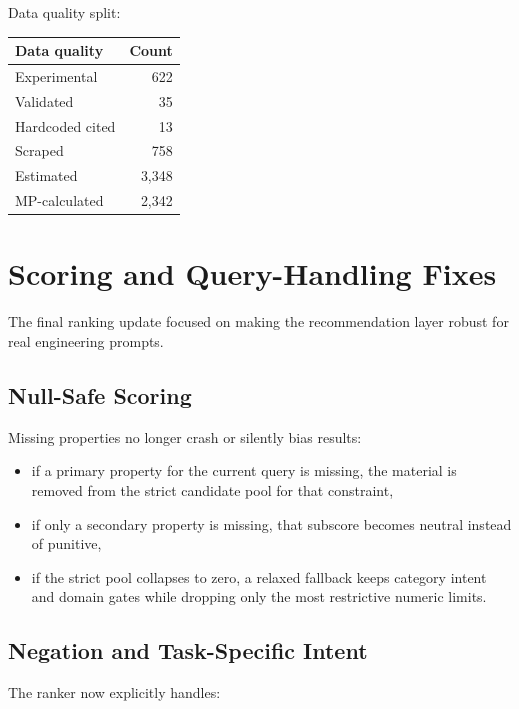 \documentclass[11pt,a4paper]{article}
\begin{document}
Data quality split:

\begin{center}
\begin{tabular}{lr}
\toprule
\textbf{Data quality} & \textbf{Count} \\
\midrule
Experimental & 622 \\
Validated & 35 \\
Hardcoded cited & 13 \\
Scraped & 758 \\
Estimated & 3,348 \\
MP-calculated & 2,342 \\
\bottomrule
\end{tabular}
\end{center}

\section{Scoring and Query-Handling Fixes}

The final ranking update focused on making the recommendation layer robust for real engineering prompts.

\subsection{Null-Safe Scoring}

Missing properties no longer crash or silently bias results:

\begin{itemize}[leftmargin=*]
  \item if a primary property for the current query is missing, the material is removed from the strict candidate pool for that constraint,
  \item if only a secondary property is missing, that subscore becomes neutral instead of punitive,
  \item if the strict pool collapses to zero, a relaxed fallback keeps category intent and domain gates while dropping only the most restrictive numeric limits.
\end{itemize}

\subsection{Negation and Task-Specific Intent}

The ranker now explicitly handles:
\end{document}
